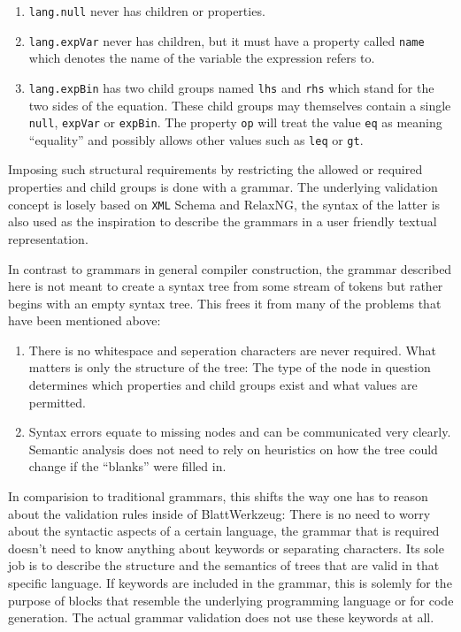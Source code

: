 \documentclass[sigconf,natbib=false,review=true,anonymous]{acmart}
\begin{document}
\begin{enumerate}
\item \texttt{lang.null} never has children or properties.

\item \texttt{lang.expVar} never has children, but it must have a property called \texttt{name} which denotes the name of the variable the expression refers to.

\item \texttt{lang.expBin} has two child groups named \texttt{lhs} and \texttt{rhs} which stand for the two sides of the equation. These child groups may themselves contain a single \texttt{null}, \texttt{expVar} or \texttt{expBin}. The property \texttt{op} will treat the value \texttt{eq} as meaning \enquote{equality} and possibly allows other values such as \texttt{leq} or \texttt{gt}.
\end{enumerate}

Imposing such structural requirements by restricting the allowed or required properties and child groups is done with a grammar. The underlying validation concept is losely based on \texttt{XML} Schema and RelaxNG, the syntax of the latter is also used as the inspiration to describe the grammars in a user friendly textual representation.

In contrast to grammars in general compiler construction, the grammar described here is not meant to create a syntax tree from some stream of tokens but rather begins with an empty syntax tree. This frees it from many of the problems that have been mentioned above:

\begin{enumerate}
\item There is no whitespace and seperation characters are never required. What matters is only the structure of the tree: The type of the node in question determines which properties and child groups exist and what values are permitted.
\item Syntax errors equate to missing nodes and can be communicated very clearly. Semantic analysis does not need to rely on heuristics on how the tree could change if the \enquote{blanks} were filled in.
\end{enumerate}

In comparision to traditional grammars, this shifts the way one has to reason about the validation rules inside of BlattWerkzeug: There is no need to worry about the syntactic aspects of a certain language, the grammar that is required doesn’t need to know anything about keywords or separating characters. Its sole job is to describe the structure and the semantics of trees that are valid in that specific language. If keywords are included in the grammar, this is solemly for the purpose of blocks that resemble the underlying programming language or for code generation. The actual grammar validation does not use these keywords at all.
\end{document}
